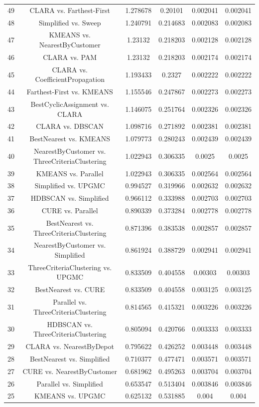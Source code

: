 \documentclass[a4paper,10pt]{article}
\begin{document}
\begin{landscape}
\begin{table}[!htp]
\begin{tabular}{cccccc}
49&CLARA vs. Farthest-First&1.278678&0.20101&0.002041&0.002041\\
48&Simplified vs. Sweep&1.240791&0.214683&0.002083&0.002083\\
47&KMEANS vs. NearestByCustomer&1.23132&0.218203&0.002128&0.002128\\
46&CLARA vs. PAM&1.23132&0.218203&0.002174&0.002174\\
45&CLARA vs. CoefficientPropagation&1.193433&0.2327&0.002222&0.002222\\
44&Farthest-First vs. KMEANS&1.155546&0.247867&0.002273&0.002273\\
43&BestCyclicAssignment vs. CLARA&1.146075&0.251764&0.002326&0.002326\\
42&CLARA vs. DBSCAN&1.098716&0.271892&0.002381&0.002381\\
41&BestNearest vs. KMEANS&1.079773&0.280243&0.002439&0.002439\\
40&NearestByCustomer vs. ThreeCriteriaClustering&1.022943&0.306335&0.0025&0.0025\\
39&KMEANS vs. Parallel&1.022943&0.306335&0.002564&0.002564\\
38&Simplified vs. UPGMC&0.994527&0.319966&0.002632&0.002632\\
37&HDBSCAN vs. Simplified&0.966112&0.333988&0.002703&0.002703\\
36&CURE vs. Parallel&0.890339&0.373284&0.002778&0.002778\\
35&BestNearest vs. ThreeCriteriaClustering&0.871396&0.383538&0.002857&0.002857\\
34&NearestByCustomer vs. Simplified&0.861924&0.388729&0.002941&0.002941\\
33&ThreeCriteriaClustering vs. UPGMC&0.833509&0.404558&0.00303&0.00303\\
32&BestNearest vs. CURE&0.833509&0.404558&0.003125&0.003125\\
31&Parallel vs. ThreeCriteriaClustering&0.814565&0.415321&0.003226&0.003226\\
30&HDBSCAN vs. ThreeCriteriaClustering&0.805094&0.420766&0.003333&0.003333\\
29&CLARA vs. NearestByDepot&0.795622&0.426252&0.003448&0.003448\\
28&BestNearest vs. Simplified&0.710377&0.477471&0.003571&0.003571\\
27&CURE vs. NearestByCustomer&0.681962&0.495263&0.003704&0.003704\\
26&Parallel vs. Simplified&0.653547&0.513404&0.003846&0.003846\\
25&KMEANS vs. UPGMC&0.625132&0.531885&0.004&0.004\\

\end{tabular}
\end{table}
\end{landscape}
\end{document}
